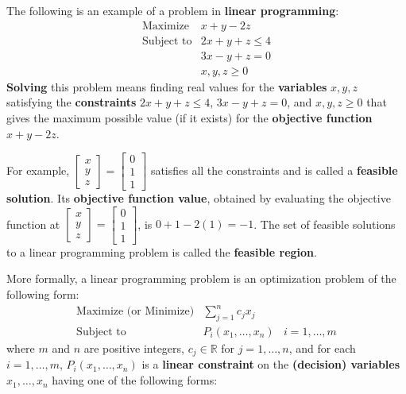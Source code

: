 \documentclass[]{book}
\newcommand{\RR}{\mathbb{R}}
\theoremstyle{definition}
\theoremstyle{definition}
\theoremstyle{remark}
\begin{document}
The following is an example of a problem in \textbf{linear programming}:
\[
\begin{array}{rl}
\text{Maximize} & x + y - 2z \\
\text{Subject to} &  2x + y + z \leq 4 \\
& 3x - y + z = 0 \\
&  x, y, z \geq 0
\end{array}
\] \textbf{Solving} this problem means finding real values for the
\textbf{variables} \(x,y,z\) satisfying the \textbf{constraints}
\(2x + y + z \leq 4\), \(3x-y +z =0\), and \(x,y,z \geq 0\) that gives
the maximum possible value (if it exists) for the \textbf{objective
function} \(x + y - 2z\).

For example,
\(\begin{bmatrix} x\\y\\z\end{bmatrix} = \begin{bmatrix} 0 \\ 1 \\ 1\end{bmatrix}\)
satisfies all the constraints and is called a \textbf{feasible
solution}. Its \textbf{objective function value}, obtained by evaluating
the objective function at
\(\begin{bmatrix} x\\y\\z\end{bmatrix} = \begin{bmatrix} 0 \\ 1 \\ 1\end{bmatrix}\),
is \(0 + 1 - 2(1) = -1\). The set of feasible solutions to a linear
programming problem is called the \textbf{feasible region}.

More formally, a linear programming problem is an optimization problem
of the following form: \[
\begin{array}{rll}
\text{Maximize (or Minimize)} & \displaystyle\sum_{j=1}^n c_j x_j \\
\text{Subject to} &  P_i(x_1, \ldots, x_n) & i = 1,\ldots, m
\end{array}
\] where \(m\) and \(n\) are positive integers, \(c_j \in \RR\) for
\(j = 1,\ldots, n\), and for each \(i = 1,\ldots, m\),
\(P_i(x_1,\ldots, x_n)\) is a \textbf{linear constraint} on the
\textbf{(decision) variables} \(x_1,\ldots, x_n\) having one of the
following forms:
\end{document}
